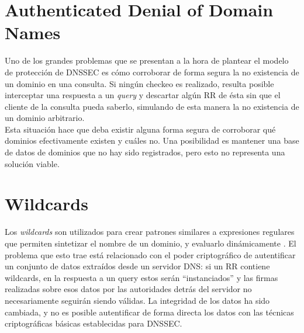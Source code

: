 \section{Authenticated Denial of Domain Names}

Uno de los grandes problemas que se presentan a la hora de plantear el modelo
de protecci\'on de DNSSEC es c\'omo corroborar de forma segura la no existencia de
un dominio en una consulta. Si ning\'un checkeo es realizado, resulta posible
interceptar una respuesta a un \textit{query} y descartar alg\'un RR de \'esta sin que
el cliente de la consulta pueda saberlo, simulando de esta manera la no existencia de un dominio arbitrario.\\
Esta situaci\'on hace que deba existir alguna forma segura de corroborar qu\'e dominios
efectivamente existen y cu\'ales no. Una posibilidad es mantener una base de
datos de dominios que no hay sido registrados, pero esto no representa una
soluci\'on viable.

\section{Wildcards}

Los \textit{wildcards} son utilizados para crear patrones similares a
expresiones regulares que permiten sintetizar el nombre de un dominio, y
evaluarlo din\'amicamente \cite{rfc1034}. El problema que esto trae est\'a
relacionado con el poder criptogr\'afico de autentificar un conjunto de datos
extra\'idos desde un servidor DNS: si un RR contiene wildcards, en la respuesta a
un query estos ser\'an ``instanciados'' y las firmas realizadas sobre esos datos
por las autoridades detr\'as del servidor no necesariamente seguir\'an siendo
v\'alidas. La integridad de los datos ha sido cambiada, y no es posible autentificar de forma
directa los datos con las t\'ecnicas criptogr\'aficas b\'asicas
establecidas para DNSSEC.

